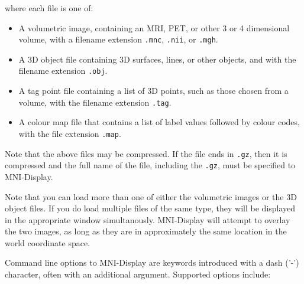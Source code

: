 \documentclass[11pt,letterpaper]{article}
\newcommand{\ident}[1]{{\tt #1}}
\newcommand{\display}{\mbox{MNI-Display}}
\begin{document}
where each file is one of:

\vspace{.5cm}

\begin{itemize}
\item A volumetric image, containing an MRI, PET, or other 3 or 4 dimensional volume, with a filename extension \ident{.mnc}, \ident{.nii}, or \ident{.mgh}.

\item A 3D object file containing 3D surfaces, lines, or other objects, and
with the filename extension \ident{.obj}.

\item A tag point file containing a list of 3D points, such as those chosen from a volume, with the filename extension \ident{.tag}.

\item A colour map file that contains a list of label values followed by colour 
codes, with the file extension \ident{.map}.
\end{itemize}

Note that the above files may be compressed.  If the file ends in
\ident{.gz}, then it is compressed and the full name of the file, including the
\ident{.gz}, must be specified to \display{}.

Note that you can load more than one of either the volumetric images
or the 3D object files. If you do load multiple files of the same
type, they will be displayed in the appropriate window
simultanously. \display{} will attempt to overlay the two images, as
long as they are in approximately the same location in the world
coordinate space.

Command line options to \display{} are keywords introduced with a dash ('-') character, often with an additional argument. Supported options include:
\end{document}
